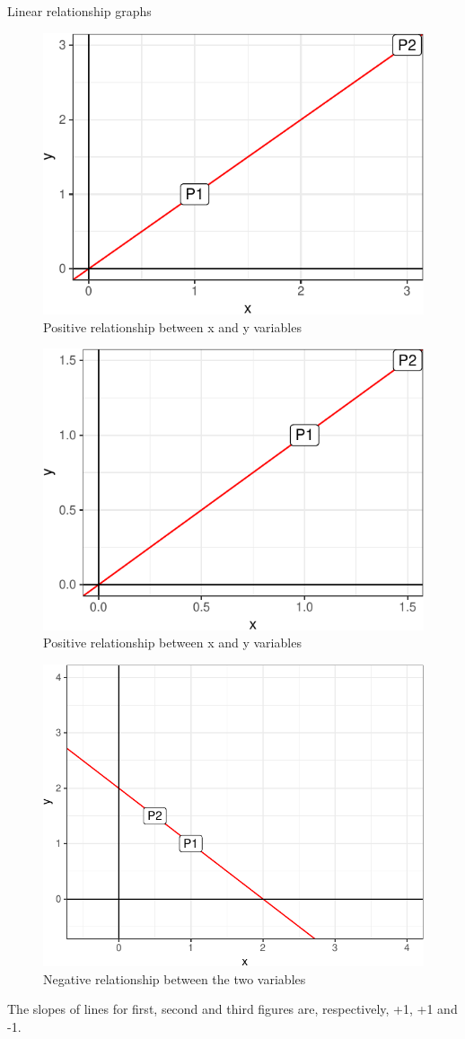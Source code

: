 \documentclass[12pt,ignorenonframetext,aspectratio=169]{beamer}
\begin{document}
\begin{frame}{Linear relationship graphs}
\protect\hypertarget{linear-relationship-graphs}{}

\begin{figure}
\includegraphics[width=0.28\linewidth]{production_economics_files/figure-beamer/linear-relationship-positive-1} \caption{Positive relationship between x and y variables}\label{fig:linear-relationship-positive1}
\end{figure}
\begin{figure}
\includegraphics[width=0.28\linewidth]{production_economics_files/figure-beamer/linear-relationship-positive-2} \caption{Positive relationship between x and y variables}\label{fig:linear-relationship-positive2}
\end{figure}

\end{frame}

\begin{frame}{}
\protect\hypertarget{section-11}{}

\begin{figure}
\includegraphics[width=0.45\linewidth]{production_economics_files/figure-beamer/linear-relationship-negative-1} \caption{Negative relationship between the two variables}\label{fig:linear-relationship-negative}
\end{figure}

The slopes of lines for first, second and third figures are,
respectively, +1, +1 and -1.

\end{frame}
\end{document}
